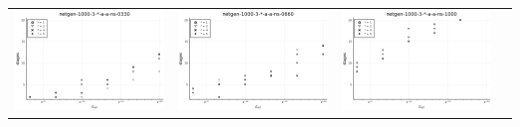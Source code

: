\documentclass{article}
\begin{document}
\begin{landscape}
\begin{center}
\begin{longtable}{| c | c | c | c |}
\includegraphics[height=0.22\textheight]{hiter_fixlim_netgen-1000-3-_-a-a-ns-0330.png} &
\includegraphics[height=0.22\textheight]{hiter_fixlim_netgen-1000-3-_-a-a-ns-0660.png} &
\includegraphics[height=0.22\textheight]{hiter_fixlim_netgen-1000-3-_-a-a-ns-1000.png} \\

\end{longtable}
\end{center}
\end{landscape}
\end{document}
